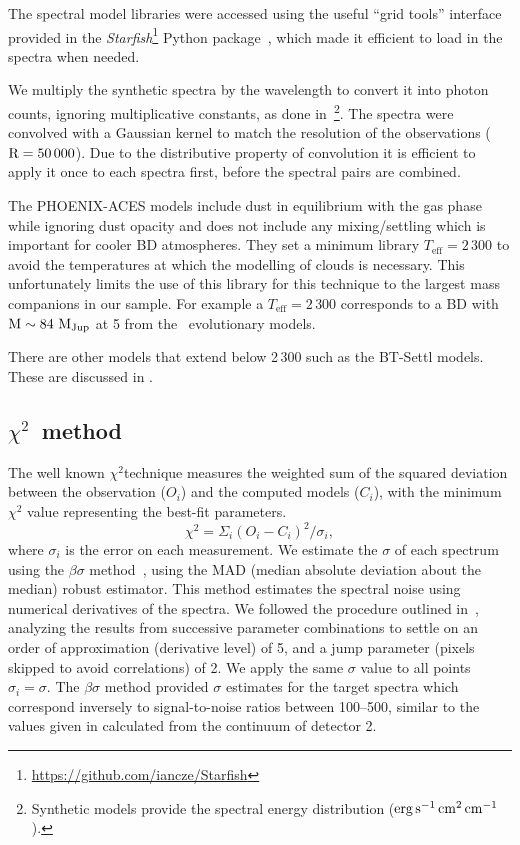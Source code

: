 

The spectral model libraries were accessed using the useful ``grid tools'' interface provided in the \emph{Starfish}\footnote{\url{https://github.com/iancze/Starfish}} Python package~\citep{czekala_constructing_2015}, which made it efficient to load in the spectra when needed.

We multiply the synthetic spectra by the wavelength to convert it into photon counts, ignoring multiplicative constants, as done in~\citet{figueira_radial_2016}\footnote{Synthetic models provide the spectral energy distribution (\(\rm erg\,s^{-1}\,cm^{2}\,cm^{-1}\)).}. The spectra were convolved with a Gaussian kernel to match the resolution of the observations (\(\rm R=50\,000\)). Due to the distributive property of convolution it is efficient to apply it once to each spectra first, before the spectral pairs are combined.

The {PHOENIX-ACES} models include dust in equilibrium with the gas phase while ignoring dust opacity and does not include any mixing/settling which is important for cooler BD atmospheres. They set a minimum library \(T_{\textrm{eff}}=2\,300\)\K{} to avoid the temperatures at which the modelling of clouds is necessary. This unfortunately limits the use of this library for this technique to the largest mass companions in our sample. For example a \(T_{\textrm{eff}}=2\,300\)\K{} corresponds to a BD with \(\rm M\sim84~M_{Jup}\) at 5\Gyr{} from the~\citet{baraffe_evolutionary_2003} evolutionary models.

There are other models that extend below 2\,300\K{} such as the {BT-Settl} models\citep{allard_btsettl_2013,baraffe_new_2015}. These are discussed in .


\subsection{\texorpdfstring{\(\chi^{2}\)}\ \ method}
\label{subsec:chi2}
The well known \(\chi^{2}\)technique measures the weighted sum of the squared deviation between the observation (\({O}_{i}\)) and the computed models (\(C_{i}\)), with the minimum \(\chi^2\) value representing the best-fit parameters.
\[\chi^{2} = {\Sigma}_i {(O_{i} - C_{i})}^2 / {\sigma}_{i},\] where \({\sigma}_{i}\) is the error on each measurement. We estimate the \(\sigma\) of each spectrum using the \(\beta\sigma\) method~\citep{czesla_posteriori_2018}, using the MAD (median absolute deviation about the median) robust estimator. {\rd{} This method estimates the spectral noise using numerical derivatives of the spectra. We followed the procedure outlined in~\citet{czesla_posteriori_2018}, analyzing the results from successive parameter combinations to settle on an order of approximation (derivative level) of 5, and a jump parameter (pixels skipped to avoid correlations) of 2.} We apply the same \(\sigma\) value to all points \({\sigma}_{i} = \sigma\).
The \(\beta\sigma\) method provided \(\sigma\) estimates for the target spectra which correspond inversely to signal-to-noise ratios between 100--500, {\rd{} similar to the values given in  calculated from the continuum of detector 2.}


